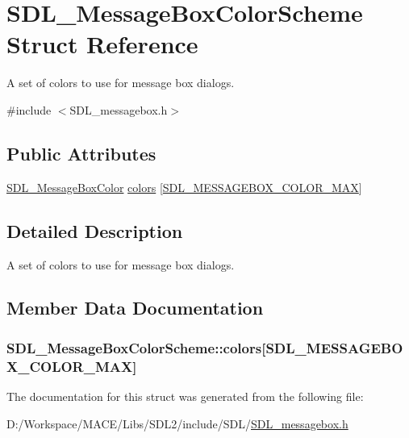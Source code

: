\hypertarget{struct_s_d_l___message_box_color_scheme}{}\section{S\+D\+L\+\_\+\+Message\+Box\+Color\+Scheme Struct Reference}
\label{struct_s_d_l___message_box_color_scheme}


A set of colors to use for message box dialogs.  




{\ttfamily \#include $<$S\+D\+L\+\_\+messagebox.\+h$>$}

\subsection*{Public Attributes}
\begin{DoxyCompactItemize}
\item 
\hyperlink{struct_s_d_l___message_box_color}{S\+D\+L\+\_\+\+Message\+Box\+Color} \hyperlink{struct_s_d_l___message_box_color_scheme_ae3712ec81e41b63b781b7d49d3b3b8f6}{colors} \mbox{[}\hyperlink{_s_d_l__messagebox_8h_a75e562d38bc214725e01f4f829bc1567a0a575b056603e38e844b141c83a44d89}{S\+D\+L\+\_\+\+M\+E\+S\+S\+A\+G\+E\+B\+O\+X\+\_\+\+C\+O\+L\+O\+R\+\_\+\+M\+AX}\mbox{]}
\end{DoxyCompactItemize}


\subsection{Detailed Description}
A set of colors to use for message box dialogs. 

\subsection{Member Data Documentation}
\subsubsection[{\texorpdfstring{colors}{colors}}]{ S\+D\+L\+\_\+\+Message\+Box\+Color\+Scheme\+::colors\mbox{[}{\bf S\+D\+L\+\_\+\+M\+E\+S\+S\+A\+G\+E\+B\+O\+X\+\_\+\+C\+O\+L\+O\+R\+\_\+\+M\+AX}\mbox{]}}\hypertarget{struct_s_d_l___message_box_color_scheme_ae3712ec81e41b63b781b7d49d3b3b8f6}{}\label{struct_s_d_l___message_box_color_scheme_ae3712ec81e41b63b781b7d49d3b3b8f6}


The documentation for this struct was generated from the following file\+:\begin{DoxyCompactItemize}
\item 
D\+:/\+Workspace/\+M\+A\+C\+E/\+Libs/\+S\+D\+L2/include/\+S\+D\+L/\hyperlink{_s_d_l__messagebox_8h}{S\+D\+L\+\_\+messagebox.\+h}\end{DoxyCompactItemize}
